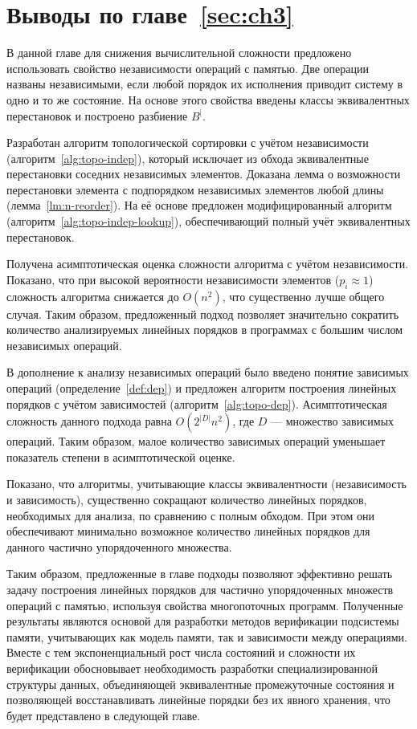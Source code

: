\section{Выводы по главе~\ref{sec:ch3}}

В данной главе для снижения вычислительной сложности предложено
использовать свойство независимости операций с памятью. Две операции
названы независимыми, если любой порядок их исполнения приводит
систему в одно и то же состояние. На основе этого свойства введены
классы эквивалентных перестановок и построено разбиение $B^|$.

Разработан алгоритм топологической сортировки с учётом независимости
(алгоритм~\ref{alg:topo-indep}), который исключает из обхода
эквивалентные перестановки соседних независимых элементов. Доказана
лемма о возможности перестановки элемента с подпорядком независимых
элементов любой длины (лемма~\ref{lm:n-reorder}). На её основе
предложен модифицированный алгоритм
(алгоритм~\ref{alg:topo-indep-lookup}), обеспечивающий полный учёт
эквивалентных перестановок.

Получена асимптотическая оценка сложности алгоритма с учётом
независимости. Показано, что при высокой вероятности независимости
элементов ($p_i \approx 1$) сложность алгоритма снижается до
$O(n^2)$, что существенно лучше общего случая. Таким образом,
предложенный подход позволяет значительно сократить количество
анализируемых линейных порядков в программах с большим числом
независимых операций.

В дополнение к анализу независимых операций было введено понятие
зависимых операций (определение~\ref{def:dep}) и предложен алгоритм
построения линейных порядков с учётом зависимостей
(алгоритм~\ref{alg:topo-dep}). Асимптотическая сложность данного
подхода равна $O(2^{|D|} n^2)$, где $D$ — множество зависимых
операций. Таким образом, малое количество зависимых операций
уменьшает показатель степени в асимптотической оценке.

Показано, что алгоритмы, учитывающие классы эквивалентности
(независимость и зависимость), существенно сокращают количество
линейных порядков, необходимых для анализа, по сравнению с полным
обходом. При этом они обеспечивают минимально возможное количество
линейных порядков для данного частично упорядоченного множества.

Таким образом, предложенные в главе подходы позволяют эффективно
решать задачу построения линейных порядков для частично упорядоченных
множеств операций с памятью, используя свойства многопоточных
программ. Полученные результаты являются основой для разработки
методов верификации подсистемы памяти, учитывающих как модель памяти,
так и зависимости между операциями. Вместе с тем экспоненциальный
рост числа состояний и сложности их верификации обосновывает
необходимость разработки специализированной структуры данных,
объединяющей эквивалентные промежуточные состояния и позволяющей
восстанавливать линейные порядки без их явного хранения, что будет
представлено в следующей главе.

\clearpage

